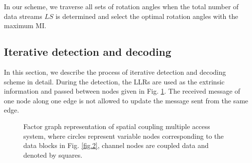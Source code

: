 \documentclass[conference]{IEEEtran}
\begin{document}
In our scheme, we traverse all sets of rotation angles when the total number of data streams $LS$ is determined and select the optimal rotation angles with the maximum MI.
\subsection{Iterative detection and decoding}
In this section, we describe the process of iterative detection and decoding scheme in detail. During the detection, the LLRs are used as the extrinsic information and passed between nodes given in Fig. \ref{fig.5}. The received message of one node along one edge is not allowed to update the message sent from the same edge.

\begin{figure}[h!]
\setlength{\abovecaptionskip}{0.cm}
\setlength{\belowcaptionskip}{-0.cm}
  \caption{Factor graph representation of spatial coupling multiple access system, where circles represent variable nodes corresponding to the data blocks in Fig. \ref{fig.2}, channel nodes are coupled data and denoted by squares.}\label{fig.5}
    \vspace{-1em}
\end{figure}
\end{document}

